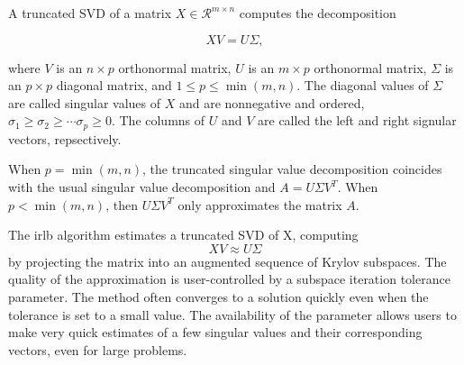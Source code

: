 \documentclass[landscape,a0b,final]{a0poster}
\newenvironment{poster}{
  \begin{center}
  \begin{minipage}[c]{0.98\textwidth}
}{
  \end{minipage} 
  \end{center}
}
\newcommand{\pbox}[4]{
\psshadowbox[#3]{
\begin{minipage}[t][#2][t]{#1}
#4
\end{minipage}
}}
\begin{document}
\begin{poster}
\begin{multicols}{3}
A truncated SVD of a matrix $X \in \mathcal{R}^{m \times n}$ computes the
decomposition

\[
XV = U\Sigma,
\]

where $V$ is an $n\times p$ orthonormal matrix,
$U$ is an $m \times p$ orthonormal matrix, $\Sigma$ is an $p \times p$
diagonal matrix, and $1\le p\le\min(m,n)$.
The diagonal values of $\Sigma$ are called singular values of $X$ and
are nonnegative and ordered,
$\sigma_1\ge \sigma_2\ge \cdots \sigma_p \geq 0$.
The columns of $U$ and $V$ are
called the left and right signular vectors, repsectively.

\vspace{0.75cm}

When $p=\min(m,n)$, the truncated singular value decomposition coincides
with the usual singular value decomposition and $A = U\Sigma V^T$. When
$p<\min(m,n)$, then $U\Sigma V^T$ only approximates the matrix $A$.

\vspace{0.75cm}
The irlb algorithm estimates a truncated SVD of X, computing
\[
XV \approx U\Sigma
\]
by projecting the matrix into an augmented sequence of Krylov subspaces.
The quality of the approximation is user-controlled by a subspace iteration
tolerance parameter. The method often converges to a solution quickly even
when the tolerance is set to a small value. The availability of the parameter
allows users to make very quick estimates of a few singular values and
their corresponding vectors, even for large problems.


\columnbreak

\vspace{2cm}\begin{center}\pbox{0.8\columnwidth}{}{linewidth=2mm,framearc=0.1,fillstyle=gradient,gradangle=0,gradbegin=white,gradend=white,gradmidpoint=1.0,framesep=1em}{\begin{center}\bf{Discussion}\end{center}}\end{center}\vspace{1.25cm}


\end{multicols}
\end{poster}
\end{document}
